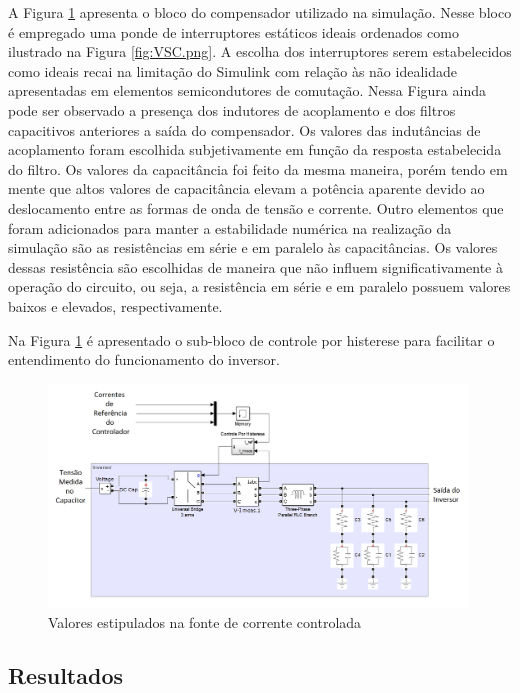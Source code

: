 A Figura \ref{fig:Inversor.png} apresenta o bloco do compensador utilizado na simulação. Nesse bloco é empregado uma ponde de interruptores estáticos ideais ordenados como ilustrado na Figura \ref{fig:VSC.png}. A escolha dos interruptores serem estabelecidos como ideais recai na limitação do Simulink com relação às não idealidade apresentadas em elementos semicondutores de comutação. Nessa Figura ainda pode ser observado a presença dos indutores de acoplamento e dos filtros capacitivos anteriores a saída do compensador. Os valores das indutâncias de acoplamento foram escolhida subjetivamente em função da resposta estabelecida do filtro. Os valores da capacitância foi feito da mesma maneira, porém tendo em mente que altos valores de capacitância elevam a potência aparente devido ao deslocamento entre as formas de onda de tensão e corrente. Outro elementos que foram adicionados para manter a estabilidade numérica na realização da simulação são as resistências em série e em paralelo às capacitâncias. Os valores dessas resistência são escolhidas de maneira que não influem significativamente à operação do circuito, ou seja, a resistência em série e em paralelo possuem valores baixos e elevados, respectivamente.

Na Figura \ref{fig:Inversor.png} é apresentado o sub-bloco de controle por histerese para facilitar o entendimento do funcionamento do inversor.
 
\begin{figure}[!htb] %
	\centering
	\includegraphics[width=0.99\textwidth]{Cap4/Figuras/Inversor.png}
	\caption{Valores estipulados na fonte de corrente controlada}
	\label{fig:Inversor.png}
\end{figure}

\subsection{Resultados}


